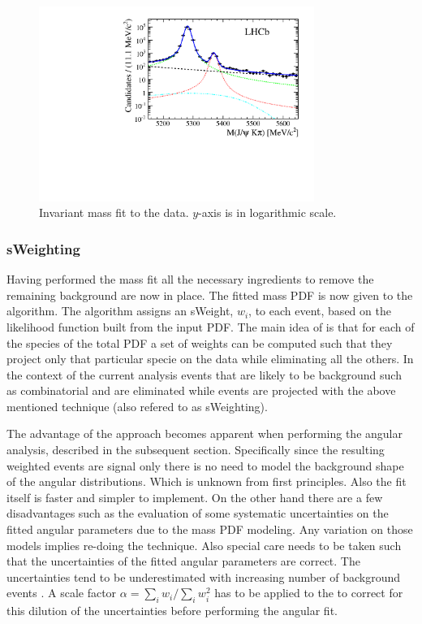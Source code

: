 \begin{figure}[h]
\begin{center}
  \includegraphics[width=0.8\textwidth]{Figures/Chapter4/mass_plot_simul_log.pdf}
  \caption{Invariant mass fit to the data. $y$-axis is in logarithmic scale.}
  \label{mass_plot}
\end{center}
\end{figure}

\subsubsection{sWeighting}
Having performed the mass fit all the necessary ingredients to remove the remaining background are now in place. 
The fitted mass PDF is now given to the \sPlot algorithm. The algorithm assigns an sWeight, $w_i$, to each event,
based on the likelihood function built from the input PDF. The main idea of \sPlot is that for each of the species of the total
PDF a set of weights can be computed such that they project only that particular specie on the data while eliminating all the others.  
In the context of the current analysis events that are likely to be background such as combinatorial and \LbJpsipK are
eliminated while \BJpsiKst events are projected with the above mentioned technique (also refered to as sWeighting).

The advantage of the \sWeights approach becomes apparent when performing the angular analysis, described in the subsequent section. Specifically since the resulting 
\BsJpsiKst weighted events are signal only there is no need to model the background shape of the angular distributions. Which
is unknown from first principles. Also the fit itself is faster and simpler to implement. On the other hand there are a few 
disadvantages such as the evaluation of some systematic uncertainties on the fitted angular parameters due to the mass PDF modeling.
Any variation on those models implies re-doing the \sPlot technique. Also special care needs to be taken such that the uncertainties
of the fitted angular parameters are correct. The uncertainties tend to be underestimated with increasing number of background events \cite{splot}.
A scale factor $\alpha = \sum_{i} w_i /\sum_{i} w_i^2$  has to be applied to the \sWeights to correct for this dilution of the uncertainties
before performing the angular fit.

